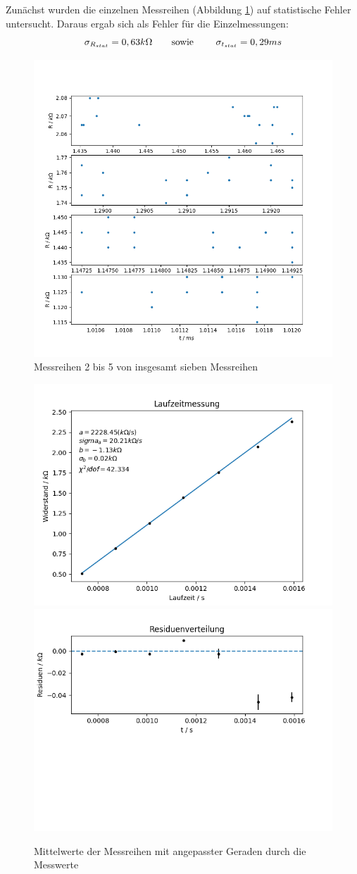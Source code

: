 \documentclass[12pt,a4paper]{article}
\begin{document}
	Zunächst wurden die einzelnen Messreihen (Abbildung \ref{pic:messreihen_laufzeit}) auf statistische Fehler untersucht. Daraus ergab sich als Fehler für die Einzelmessungen:
	\begin{equation}
	\sigma _{R_{stat}} = 0,63 k\Omega \text{\qquad sowie \qquad} \sigma_{t_{stat}} = 0,29 ms
	\end{equation}
	\begin{figure}
	\begin{center}
		\includegraphics[width=0.6\linewidth]{messreihen_2bis5_laufzeit}
		\caption{Messreihen 2 bis 5 von insgesamt sieben Messreihen}
		\label{pic:messreihen_laufzeit}
	\end{center}
	\end{figure}	
	\begin{figure}
	\begin{center}	
		\includegraphics[width=0.55\linewidth]{fit_laufzeit}
		\includegraphics[width=0.55\linewidth]{residuen_laufzeit}
		\caption{Mittelwerte der Messreihen mit angepasster Geraden durch die Messwerte}
		\label{pic:fit_laufzeit}
		
		
	\end{center}
	\end{figure}
\end{document}

